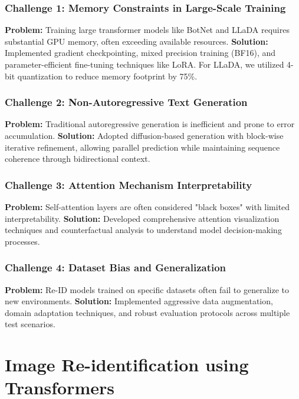 \documentclass[a4paper,12pt]{article}
\begin{document}
\subsubsection*{Challenge 1: Memory Constraints in Large-Scale Training}
\textbf{Problem:} Training large transformer models like BotNet and LLaDA requires substantial GPU memory, often exceeding available resources.
\textbf{Solution:} Implemented gradient checkpointing, mixed precision training (BF16), and parameter-efficient fine-tuning techniques like LoRA. For LLaDA, we utilized 4-bit quantization to reduce memory footprint by 75\%.

\subsubsection*{Challenge 2: Non-Autoregressive Text Generation}
\textbf{Problem:} Traditional autoregressive generation is inefficient and prone to error accumulation.
\textbf{Solution:} Adopted diffusion-based generation with block-wise iterative refinement, allowing parallel prediction while maintaining sequence coherence through bidirectional context.

\subsubsection*{Challenge 3: Attention Mechanism Interpretability}
\textbf{Problem:} Self-attention layers are often considered "black boxes" with limited interpretability.
\textbf{Solution:} Developed comprehensive attention visualization techniques and counterfactual analysis to understand model decision-making processes.

\subsubsection*{Challenge 4: Dataset Bias and Generalization}
\textbf{Problem:} Re-ID models trained on specific datasets often fail to generalize to new environments.
\textbf{Solution:} Implemented aggressive data augmentation, domain adaptation techniques, and robust evaluation protocols across multiple test scenarios.

\newpage

\section{Image Re-identification using Transformers}
\end{document}
